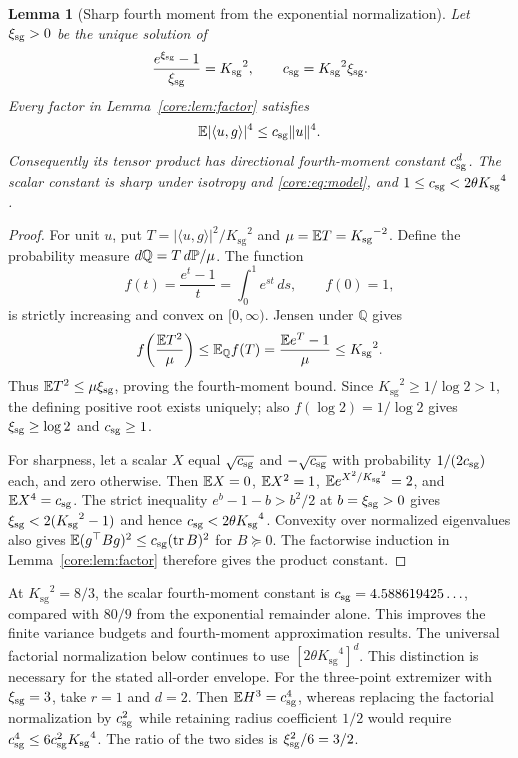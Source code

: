 \documentclass[11pt,a4paper]{article}
\newtheorem{lemma}[theorem]{Lemma}
\theoremstyle{definition}\newtheorem{definition}[theorem]{Definition}
\theoremstyle{remark}\newtheorem{remark}[theorem]{Remark}
\numberwithin{equation}{section}
\newcommand{\Ksg}{{K_{\mathrm{sg}}}}\newcommand{\Cfour}{{C_4}}
\newcommand{\norm}[1]{\lVert#1\rVert}\newcommand{\ip}[2]{\langle#1,#2\rangle}
\DeclareMathOperator{\tr}{tr}\DeclareMathOperator{\rank}{rank}
\begin{document}
\begin{lemma}[Sharp fourth moment from the exponential normalization]
\label{core:lem:sharp-sg-fourth}
Let $\xi_{\rm sg}>0$ be the unique solution of
\begin{equation}\label{core:eq:sg-fourth-root}
 \frac{e^{\xi_{\rm sg}}-1}{\xi_{\rm sg}}=\Ksg^2,
 \qquad c_{\rm sg}=\Ksg^2\xi_{\rm sg}.
\end{equation}
Every factor in Lemma~\ref{core:lem:factor} satisfies
\[
 \E|\ip ug|^4\le c_{\rm sg}\norm u^4.
\]
Consequently its tensor product has directional fourth-moment constant
$c_{\rm sg}^d$. The scalar constant is sharp under isotropy and
\eqref{core:eq:model}, and
$1\le c_{\rm sg}<2\theta\Ksg^4$.
\end{lemma}
\begin{proof}
For unit $u$, put $T=|\ip ug|^2/\Ksg^2$ and
$\mu=\E T=\Ksg^{-2}$. Define the probability measure
$d\mathbb Q=T\,d\mathbb P/\mu$. The function
\[
 f(t)=\frac{e^t-1}{t}=\int_0^1e^{st}\,ds,
 \qquad f(0)=1,
\]
is strictly increasing and convex on $[0,\infty)$. Jensen under
$\mathbb Q$ gives
\[
 f\!\left(\frac{\E T^2}{\mu}\right)
 \le\E_{\mathbb Q}f(T)
 =\frac{\E e^T-1}{\mu}\le\Ksg^2.
\]
Thus $\mathbb E T^2\le\mu\xi_{\rm sg}$, proving the fourth-moment bound.
Since $\Ksg^2\ge1/\log2>1$, the defining positive root exists uniquely;
also $f(\log2)=1/\log2$ gives $\xi_{\rm sg}\ge\log2$ and
$c_{\rm sg}\ge1$.

For sharpness, let a scalar $X$ equal $\sqrt{c_{\rm sg}}$ and
$-\sqrt{c_{\rm sg}}$ with probability $1/(2c_{\rm sg})$ each,
and zero otherwise. Then $\mathbb E X=0$, $\mathbb E X^2=1$,
$\E e^{X^2/\Ksg^2}=2$, and $\mathbb E X^4=c_{\rm sg}$.
The strict inequality
$e^b-1-b>b^2/2$ at $b=\xi_{\rm sg}>0$ gives
$\xi_{\rm sg}<2(\Ksg^2-1)$ and hence
$c_{\rm sg}<2\theta\Ksg^4$.
Convexity over normalized eigenvalues also gives
$\E(g^\top Bg)^2\le c_{\rm sg}(\tr B)^2$ for $B\succeq0$.
The factorwise induction in Lemma~\ref{core:lem:factor} therefore
gives the product constant.
\end{proof}

At $\Ksg^2=8/3$, the scalar fourth-moment constant is
$c_{\rm sg}=4.588619425\ldots$, compared with $80/9$ from the
exponential remainder alone. This improves the finite variance budgets
and fourth-moment approximation results. The universal factorial
normalization below continues to use $[2\theta\Ksg^4]^d$.
This distinction is necessary for the stated all-order envelope.
For the three-point extremizer with $\xi_{\rm sg}=3$, take $r=1$
and $d=2$. Then $\mathbb E H^3=c_{\rm sg}^4$, whereas replacing the
factorial normalization by $c_{\rm sg}^2$ while retaining radius coefficient $1/2$
would require $c_{\rm sg}^4\le6c_{\rm sg}^2\Ksg^4$.
The ratio of the two sides is $\xi_{\rm sg}^2/6=3/2$.
\end{document}
